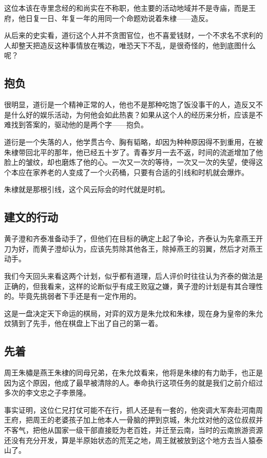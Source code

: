 \begin{multicols}{\theparacolNo}
		这位本该在寺里念经的和尚实在不称职，他主要的活动地域并不是寺庙，而是王府，他日复一日、年复一年的用同一个命题劝说着朱棣——造反。

		从后来的史实看，道衍这个人并不贪图官位，也不喜爱钱财，一个不求名不求利的人却整天把造反这种事情放在嘴边，唯恐天下不乱，是很奇怪的，他到底图什么呢？

		\subsection{抱负}
		很明显，道衍是一个精神正常的人，他也不是那种吃饱了饭没事干的人，造反又不是什么好的娱乐活动，为何他会如此热衷？如果从这个人的经历来分析，应该是不难找到答案的，驱动他的是两个字——抱负。

		道衍是一个失落的人，他学贯古今、胸有韬略，却因为种种原因得不到重用，在被朱棣带回北平的那年，他已经五十岁了。青春岁月一去不返，时间的流逝增加了他脸上的皱纹，却也磨炼了他的心。一次又一次的等待，一次又一次的失望，使得这个本应在家养老的人变成了一个火药桶，只要有合适的引线和时机就会爆炸。

		朱棣就是那根引线，这个风云际会的时代就是时机。

		\subsection{建文的行动}
		黄子澄和齐泰准备动手了，但他们在目标的确定上起了争论，齐泰认为先拿燕王开刀为好，而黄子澄却认为，应该先剪除其他各王，除掉燕王的羽翼，然后才对燕王动手。

		我们今天回头来看这两个计划，似乎都有道理，后人评价时往往认为齐泰的做法是正确的，但我看来，这样的论断似乎有成王败寇之嫌，黄子澄的计划是有其合理性的。毕竟先挑弱者下手还是有一定作用的。

		这是一盘决定天下命运的棋局，对弈的双方是朱允炆和朱棣，现在身为皇帝的朱允炆猜到了先手，他在棋盘上下出了自己的第一着。

		\subsection{先着}
		周王朱橚是燕王朱棣的同母兄弟，在朱允炆看来，他将是朱棣的有力助手，也正是因为这个原因，他成了最早被清除的人。奉命执行这项任务的就是我们之前介绍过多次的李文忠之子李景隆。

		事实证明，这位仁兄打仗可能不在行，抓人还是有一套的，他突调大军奔赴河南周王府，把周王的老婆孩子加上他本人一骨脑的押到京城，朱允炆对他的这位叔叔并不客气，把他从国家一级干部直接贬为老百姓，并迁至云南，当时的云南旅游资源还没有充分开发，算是半原始状态的荒芜之地，周王就被放到这个地方去当人猿泰山了。


\end{multicols}
